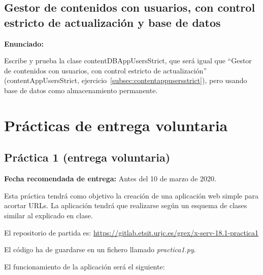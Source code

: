 \subsection{Gestor de contenidos con usuarios, con control estricto de actualización y base de datos}
\label{subsec:gestor-contenidos-usuarios-bbdd}

\textbf{Enunciado:}

Escribe y prueba la clase contentDBAppUsersStrict, que será igual que ``Gestor de contenidos con usuarios, con control estricto de actualización'' (contentAppUsersStrict, ejercicio~\ref{subsec:contentappusersstrict}), pero usando base de datos como almacenamiento permanente.

\newpage

\section{Prácticas de entrega voluntaria}


\subsection{Práctica 1 (entrega voluntaria)}
\label{subsec:practica-vol-1-2016}

\textbf{Fecha recomendada de entrega:} Antes del 10 de marzo de 2020.

Esta práctica tendrá como objetivo la creación de una aplicación web simple para acortar URLs. La aplicación tendrá que realizarse según un esquema de clases similar al explicado en clase.

El repositorio de partida es: \url{https://gitlab.etsit.urjc.es/grex/x-serv-18.1-practica1}

El código ha de guardarse en un fichero llamado \emph{practica1.py}.

El funcionamiento de la aplicación será el siguiente:

